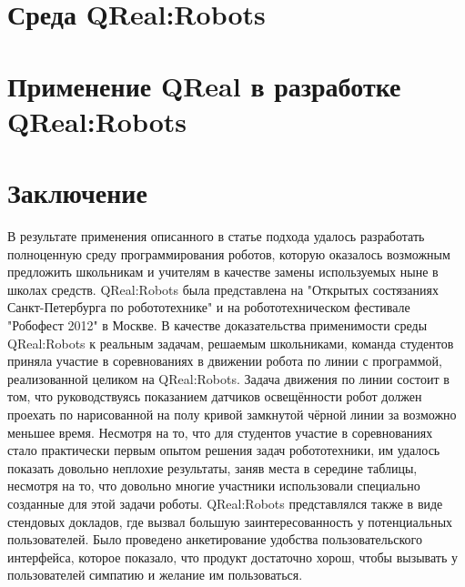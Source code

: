 \documentclass[a4paper]{article}
\begin{document}
\section{Среда QReal:Robots}

\section{Применение QReal в разработке QReal:Robots}

\section*{Заключение}
В результате применения описанного в статье подхода удалось разработать полноценную среду программирования роботов, которую оказалось возможным предложить школьникам и учителям в качестве замены используемых ныне в школах средств. QReal:Robots была представлена на "Открытых состязаниях Санкт-Петербурга по робототехнике" и на робототехническом фестивале "Робофест 2012" в Москве. В качестве доказательства применимости среды QReal:Robots к реальным задачам, решаемым школьниками, команда студентов приняла участие в соревнованиях в движении робота по линии с программой, реализованной целиком на QReal:Robots. Задача движения по линии состоит в том, что руководствуясь показанием датчиков освещённости робот должен проехать по нарисованной на полу кривой замкнутой чёрной линии за возможно меньшее время. Несмотря на то, что для студентов участие в соревнованиях стало практически первым опытом решения задач робототехники, им удалось показать довольно неплохие результаты, заняв места в середине таблицы, несмотря на то, что довольно многие участники использовали специально созданные для этой задачи роботы. QReal:Robots представлялся также в виде стендовых докладов, где вызвал большую заинтересованность у потенциальных пользователей. Было проведено анкетирование удобства пользовательского интерфейса, которое показало, что продукт достаточно хорош, чтобы вызывать у пользователей симпатию и желание им пользоваться.
\end{document}
